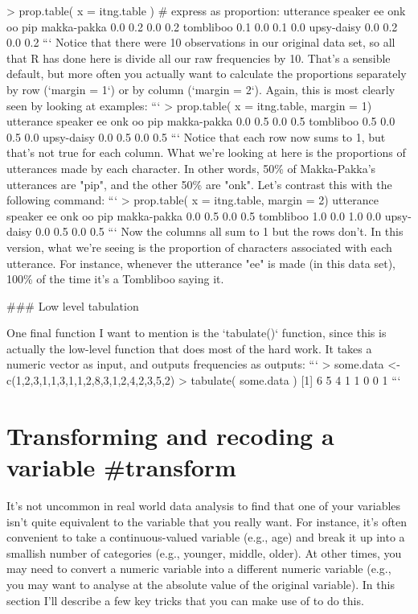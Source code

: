 > prop.table( x = itng.table ) # express as proportion:
             utterance
speaker        ee onk  oo pip
  makka-pakka 0.0 0.2 0.0 0.2
  tombliboo   0.1 0.0 0.1 0.0
  upsy-daisy  0.0 0.2 0.0 0.2
```
Notice that there were 10 observations in our original data set, so all that R has done here is divide all our raw frequencies by 10. That's a sensible default, but more often you actually want to calculate the proportions separately by row (`margin = 1`) or by column (`margin = 2`). Again, this is most clearly seen by looking at examples:
```
> prop.table( x = itng.table, margin = 1)
             utterance
speaker        ee onk  oo pip
  makka-pakka 0.0 0.5 0.0 0.5
  tombliboo   0.5 0.0 0.5 0.0
  upsy-daisy  0.0 0.5 0.0 0.5
```
Notice that each row now sums to 1, but that's not true for each column. What we're looking at here is the proportions of utterances made by each character. In other words, 50\% of Makka-Pakka's utterances are "pip", and the other 50\% are "onk". Let's contrast this with the following command:
```
> prop.table( x = itng.table, margin = 2)
             utterance
speaker        ee onk  oo pip
  makka-pakka 0.0 0.5 0.0 0.5
  tombliboo   1.0 0.0 1.0 0.0
  upsy-daisy  0.0 0.5 0.0 0.5
```
Now the columns all sum to 1 but the rows don't. In this version, what we're seeing is the proportion of characters associated with each utterance. For instance, whenever the utterance "ee" is made (in this data set), 100\% of the time it's a Tombliboo saying it. 




### Low level tabulation

One final function I want to mention is the `tabulate()` function, since this is actually the low-level function that does most of the hard work. It takes a numeric vector as input, and outputs frequencies as outputs:
```
> some.data <- c(1,2,3,1,1,3,1,1,2,8,3,1,2,4,2,3,5,2)
> tabulate( some.data )
[1] 6 5 4 1 1 0 0 1
```



\section{Transforming and recoding a variable {#transform}}

It's not uncommon in real world data analysis to find that one of your variables isn't quite equivalent to the variable that you really want. For instance, it's often convenient to take a continuous-valued variable (e.g., age) and break it up into a smallish number of categories (e.g., younger, middle, older). At other times, you may need to convert a numeric variable into a different numeric variable (e.g., you may want to analyse at the absolute value of the original variable). In this section I'll describe a few key tricks that you can make use of to do this.



